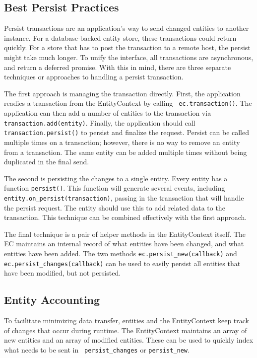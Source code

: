 \documentclass{article}
\newcommand{\ilcode}{\tt}
\begin{document}
\subsection{Best Persist Practices}
Persist transactions are an application's way to send changed entities to
another instance. For a database-backed entity store, these transactions could
return quickly. For a store that has to post the transaction to a remote host,
the persist might take much longer. To unify the interface, all transactions are
asynchronous, and return a deferred promise. With this in mind, there are three
separate techniques or approaches to handling a persist transaction.

The first approach is managing the transaction directly. First, the application
readies a transaction from the EntityContext by calling {\ilcode
ec.transaction()}. The application can then add a number of entities to the
transaction via {\ilcode transaction.add(entity)}. Finally, the application
should call {\ilcode transaction.persist()} to persist and finalize the request.
Persist can be called multiple times on a transaction; however, there is no way
to remove an entity from a transaction. The same entity can be added multiple
times without being duplicated in the final send.

The second is persisting the changes to a single entity. Every entity has a
function {\ilcode persist()}. This function will generate several events, including
{\ilcode entity.on\_persist(transaction)}, passing in the transaction that will
handle the persist request. The entity should use this to add related data to
the transaction. This technique can be combined effectively with the first
approach.

The final technique is a pair of helper methods in the EntityContext itself. The
EC maintains an internal record of what entities have been changed, and what
entities have been added. The two methods {\ilcode ec.persist\_new(callback)}
and {\ilcode ec.persist\_changes(callback)} can be used to easily persist all
entities that have been modified, but not persisted.

\subsection{Entity Accounting}

To facilitate minimizing data transfer, entities
and the EntityContext keep track of changes that occur during runtime. The
EntityContext maintains an array of new entities and an array of modified
entities. These can be used to quickly index what needs to be sent in {\ilcode
persist\_changes} or {\ilcode persist\_new}.
\end{document}
